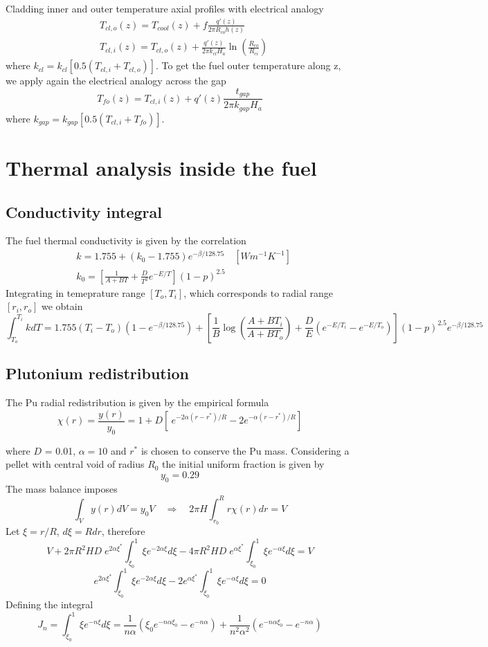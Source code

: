 \documentclass{article}
\begin{document}
Cladding inner and outer temperature axial profiles with electrical analogy
\begin{align*}
  & T_{cl,o}(z) = T_{cool}(z) + f\frac{q'(z)}{2\pi R_{co}h(z)}\\
  & T_{cl,i}(z) = T_{cl,o}(z) + \frac{q'(z)}{2\pi k_{cl}H_a}\ln\left(\frac{R_{co}}{R_{ci}}\right)
\end{align*}
where $k_{cl} = k_{cl}[0.5(T_{cl,i} + T_{cl,o})]$. To get the fuel outer temperature along z, we apply again the electrical analogy across the gap
\[
  T_{fo}(z) = T_{cl,i}(z) + q'(z)\frac{t_{gap}}{2\pi k_{gap}H_a}
\]
where $k_{gap} = k_{gap}[0.5(T_{cl,i} + T_{fo})]$. 

\section{Thermal analysis inside the fuel}
\subsection{Conductivity integral}
The fuel thermal conductivity is given by the correlation 
\begin{align*}
  & k =  1.755 + (k_0 - 1.755)e^{-\beta/128.75} \quad [W m^{-1} K^{-1}]\\
  & k_0 = \left[\frac{1}{A + BT} + \frac{D}{T^2}e^{-E/T} \right](1 - p)^{2.5}
\end{align*}
Integrating in temeprature range \([T_o, T_i]\), which corresponds to radial range \([r_i,r_o]\) we obtain
\[
  \int_{T_o}^{T_i} k dT = 1.755(T_i -  T_o)(1 - e^{-\beta/128.75}) + \left[ \frac{1}{B}\log\left(\frac{A + BT_i}{A + BT_o}\right) + \frac{D}{E}(e^{-E/T_i} - e^{-E/T_o})\right](1-p)^{2.5}e^{-\beta/128.75}
\]

\subsection{Plutonium redistribution}
The Pu radial redistribution is given by the empirical formula
\[
  \chi(r) = \frac{y(r)}{y_0} =  1 + D\left[\ e^{-2\alpha(r - r^*)/R}  - 2e^{-\alpha(r-r^*)/R} \right] 
\]

where $D$ = 0.01, $\alpha = 10$ and  $r^*$ is chosen to conserve the Pu mass. Considering a pellet with central void of radius \(R_0\) the initial uniform fraction is given by
\[
  y_0 = 0.29
\]
The mass balance imposes
\[
  \int_V y(r) dV = y_0V \quad \Rightarrow \quad 2\pi H\int_{r_0}^R r \chi(r)dr = V
\]
Let \(\xi = r/R\), \(d\xi = Rdr\), therefore
\[
  V + 2\pi R^2HD\;e^{2\alpha\xi^*}\int_{\xi_0}^1 \xi e^{-2\alpha\xi}d\xi - 4\pi R^2HD\;e^{\alpha\xi^*}\int_{\xi_0}^1 \xi e^{-\alpha\xi}d\xi = V
\]
\[
  e^{2\alpha\xi^*}\int_{\xi_0}^1 \xi e^{-2\alpha\xi}d\xi - 2e^{\alpha\xi^*}\int_{\xi_0}^1 \xi e^{-\alpha\xi}d\xi = 0
\]
Defining the integral
\[
  J_n = \int_{\xi_0}^1 \xi e^{-n\xi}d\xi = \frac{1}{n\alpha}\left( \xi_0e^{-n\alpha\xi_0} - e^{-n\alpha} \right) + \frac{1}{n^2\alpha^2}\left(e^{-n\alpha\xi_0} - e^{-n\alpha} \right)
\]
\end{document}
